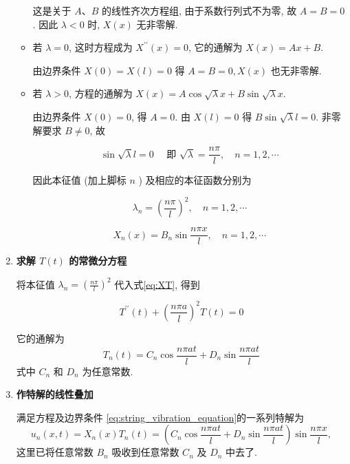 \begin{enumerate}
\begin{itemize}
        这是关于 $A 、 B$ 的线性齐次方程组, 由于系数行列式不为零, 故 $A=B=0$. 因此 $\lambda<0$ 时, $X(x)$ 无非零解.

    \item 若 $\lambda=0$, 这时方程成为 $X^{\prime \prime}(x)=0$, 它的通解为 $X(x)=A x+B$.

        由边界条件 $X(0)=X(l)=0$ 得 $A=B=0, X(x)$ 也无非零解.
    
    \item 若 $\lambda>0$, 方程的通解为 $X(x)=A \cos \sqrt{\lambda} x+B \sin \sqrt{\lambda} x$.

        由边界条件 $X(0)=0$, 得 $A=0$. 由 $X(l)=0$ 得 $B \sin \sqrt{\lambda} l=0$. 非零解要求 $B \neq 0$, 故
        
        $$
        \sin \sqrt{\lambda} l=0 \quad \text { 即 } \sqrt{\lambda}=\frac{n \pi}{l}, \quad n=1,2, \cdots
        $$
        
        因此本征值 (加上脚标 $n$ ) 及相应的本征函数分别为
        
        $$
        \lambda_{n}=\left(\frac{n \pi}{l}\right)^{2}, \quad n=1,2, \cdots
        $$
        
        $$
        X_{n}(x)=B_{n} \sin \frac{n \pi x}{l}, \quad n=1,2, \cdots
        $$
\end{itemize}





  \item \textbf{求解 $T(t)$ 的常微分方程}
  
    将本征值 $\lambda_{n}=\left(\frac{n \pi}{l}\right)^{2}$ 代入式\eqref{eq:XT}, 得到

    $$
    T^{\prime \prime}(t)+\left(\frac{n \pi a}{l}\right)^{2} T(t)=0
    $$

    它的通解为
    $$
    T_{n}(t)=C_{n} \cos \frac{n \pi a t}{l}+D_{n} \sin \frac{n \pi a t}{l}
    $$
    式中 $C_{n}$ 和 $D_{n}$ 为任意常数.
    
    \item \textbf{作特解的线性叠加}
    
    满足方程及边界条件 \eqref{eq:string_vibration_equation}的一系列特解为
    \begin{equation}
        u_{n}(x, t)=X_{n}(x) T_{n}(t)=\left(C_{n} \cos \frac{n \pi a t}{l}+D_{n} \sin \frac{n \pi a t}{l}\right) \sin \frac{n \pi x}{l}, 
        \label{eq:special_solution}
    \end{equation}
    这里已将任意常数 $B_{n}$ 吸收到任意常数 $C_{n}$ 及 $D_{n}$ 中去了.
    

\end{enumerate}

